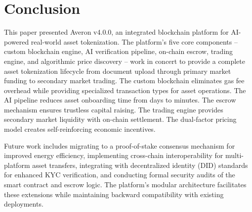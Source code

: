 \documentclass[conference]{IEEEtran}
\begin{document}
\section{Conclusion}
\label{sec:conclusion}

This paper presented Averon v4.0.0, an integrated blockchain platform for AI-powered real-world asset tokenization. The platform's five core components -- custom blockchain engine, AI verification pipeline, on-chain escrow, trading engine, and algorithmic price discovery -- work in concert to provide a complete asset tokenization lifecycle from document upload through primary market funding to secondary market trading. The custom blockchain eliminates gas fee overhead while providing specialized transaction types for asset operations. The AI pipeline reduces asset onboarding time from days to minutes. The escrow mechanism ensures trustless capital raising. The trading engine provides secondary market liquidity with on-chain settlement. The dual-factor pricing model creates self-reinforcing economic incentives.

Future work includes migrating to a proof-of-stake consensus mechanism for improved energy efficiency, implementing cross-chain interoperability for multi-platform asset transfers, integrating with decentralized identity (DID) standards for enhanced KYC verification, and conducting formal security audits of the smart contract and escrow logic. The platform's modular architecture facilitates these extensions while maintaining backward compatibility with existing deployments.
\end{document}
